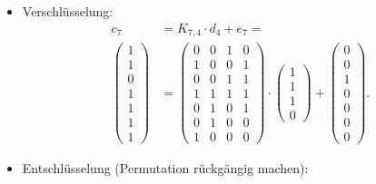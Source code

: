 \begin{itemize}
    \item Verschlüsselung:
        \begin{align*}
            c_7&=K_{7,4}\cdot d_4 + e_7=\\
        \begin{pmatrix} %
            1\\
            1\\
            0\\
            1\\
            1\\
            1\\
            1
        \end{pmatrix}
        &=
        \begin{pmatrix} %
            0 & 0 & 1 & 0\\
            1 & 0 & 0 & 1\\
            0 & 0 & 1 & 1\\
            1 & 1 & 1 & 1\\
            0 & 1 & 0 & 1\\
            0 & 1 & 0 & 0\\
            1 & 0 & 0 & 0
        \end{pmatrix}
        \cdot
        \begin{pmatrix} %
            1\\
            1\\
            1\\
            0 
        \end{pmatrix}
        +
        \begin{pmatrix} %
            0\\
            0\\
            1\\
            0\\
            0\\
            0\\
            0
        \end{pmatrix} 
        .
        \end{align*}
    \item Entschlüsselung (Permutation rückgängig machen):
        \begin{align*}

\end{align*}
\end{itemize}
